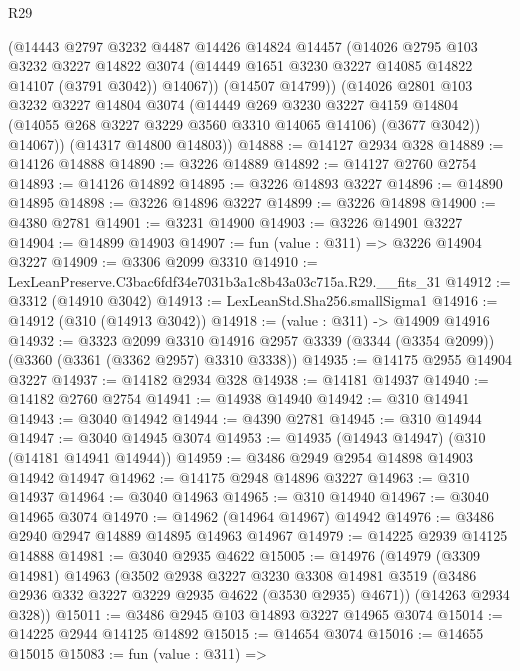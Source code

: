 \begin{lexlean}{R29}
\begin{coremodule}
          (@14443
            @2797
            @3232
            @4487
            @14426
            @14824
            @14457
            (@14026
              @2795
              @103
              @3232
              @3227
              @14822
              @3074
              (@14449 @1651 @3230 @3227 @14085 @14822 @14107 (@3791 @3042))
              @14067))
          (@14507 @14799))
        (@14026
          @2801
          @103
          @3232
          @3227
          @14804
          @3074
          (@14449
            @269
            @3230
            @3227
            @4159
            @14804
            (@14055 @268 @3227 @3229 @3560 @3310 @14065 @14106)
            (@3677 @3042))
          @14067))
      (@14317 @14800 @14803))
@14888 := @14127 @2934 @328
@14889 := @14126 @14888
@14890 := @3226 @14889
@14892 := @14127 @2760 @2754
@14893 := @14126 @14892
@14895 := @3226 @14893 @3227
@14896 := @14890 @14895
@14898 := @3226 @14896 @3227
@14899 := @3226 @14898
@14900 := @4380 @2781
@14901 := @3231 @14900
@14903 := @3226 @14901 @3227
@14904 := @14899 @14903
@14907 := fun (value : @311) => @3226 @14904 @3227
@14909 := @3306 @2099 @3310
@14910 := LexLeanPreserve.C3bac6fdf34e7031b3a1c8b43a03c715a.R29.__fits_31
@14912 := @3312 (@14910 @3042)
@14913 := LexLeanStd.Sha256.smallSigma1
@14916 := @14912 (@310 (@14913 @3042))
@14918 := (value : @311) -> @14909 @14916
@14932 := @3323
    @2099
    @3310
    @14916
    @2957
    @3339
    (@3344 (@3354 @2099))
    (@3360 (@3361 (@3362 @2957) @3310 @3338))
@14935 := @14175 @2955 @14904 @3227
@14937 := @14182 @2934 @328
@14938 := @14181 @14937
@14940 := @14182 @2760 @2754
@14941 := @14938 @14940
@14942 := @310 @14941
@14943 := @3040 @14942
@14944 := @4390 @2781
@14945 := @310 @14944
@14947 := @3040 @14945 @3074
@14953 := @14935 (@14943 @14947) (@310 (@14181 @14941 @14944))
@14959 := @3486 @2949 @2954 @14898 @14903 @14942 @14947
@14962 := @14175 @2948 @14896 @3227
@14963 := @310 @14937
@14964 := @3040 @14963
@14965 := @310 @14940
@14967 := @3040 @14965 @3074
@14970 := @14962 (@14964 @14967) @14942
@14976 := @3486 @2940 @2947 @14889 @14895 @14963 @14967
@14979 := @14225 @2939 @14125 @14888
@14981 := @3040 @2935 @4622
@15005 := @14976
    (@14979
      (@3309 @14981)
      @14963
      (@3502
        @2938
        @3227
        @3230
        @3308
        @14981
        @3519
        (@3486 @2936 @332 @3227 @3229 @2935 @4622 (@3530 @2935) @4671))
      (@14263 @2934 @328))
@15011 := @3486 @2945 @103 @14893 @3227 @14965 @3074
@15014 := @14225 @2944 @14125 @14892
@15015 := @14654 @3074
@15016 := @14655 @15015
@15083 := fun (value : @311) =>

\end{coremodule}
\end{lexlean}
